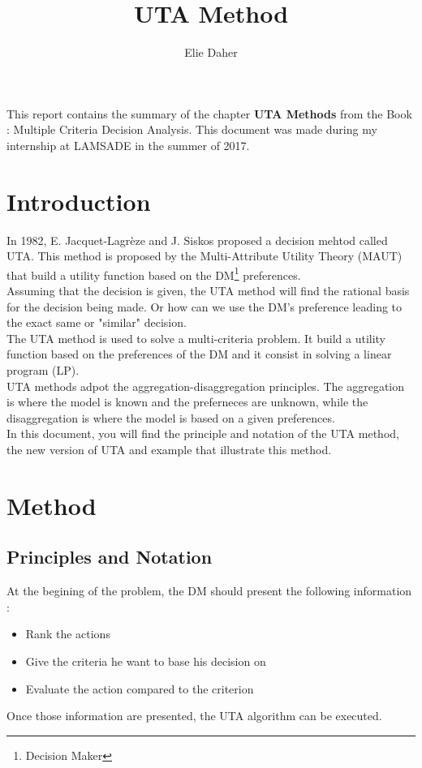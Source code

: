 \documentclass{report}
\title{UTA Method}
\author{Elie Daher}
\begin{document}
\maketitle
\abstract This report contains the summary of the chapter \textbf{UTA Methods} from the Book : Multiple Criteria Decision Analysis. This document was made during my internship at LAMSADE in the summer of 2017.
\tableofcontents{}

\chapter{Introduction}
In 1982,  E. Jacquet-Lagrèze and J. Siskos proposed a decision mehtod called UTA. This method is proposed by the Multi-Attribute Utility Theory (MAUT) that build a utility function based on the DM\footnote{Decision Maker} preferences.\\ 
Assuming that the decision is given, the UTA method will find the rational basis for the decision being made. Or how can we use the DM's preference leading to the exact same or "similar" decision. \\  

The UTA method is used to solve a multi-criteria problem. It build a utility function based on the preferences of the DM and it consist in solving a linear program (LP).\\

UTA methods adpot the aggregation-disaggregation principles. The aggregation is where the model is known and the preferneces are unknown, while the disaggregation is where the model is based on a given preferences.\\

In this document, you will find the principle and notation of the UTA method, the new version of UTA and example that illustrate this method. 

\chapter{Method}
\section{Principles and Notation}
At the begining of the problem, the DM should present the following information : 
\begin{itemize}
\item Rank the actions
\item Give the criteria he want to base his decision on 
\item Evaluate the action compared to the criterion
\end{itemize}
Once those information are presented, the UTA algorithm can be executed. 
\end{document}
